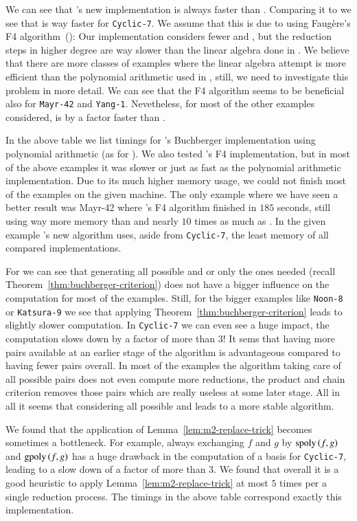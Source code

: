We can see that \singular's new implementation is always faster than \macaulay.
Comparing it to \magma we see that \magma is way faster for \texttt{Cyclic-7}.
We assume that this is due to \magma using Faug\`ere's F4
algorithm~(\cite{fF41999}): Our implementation considers fewer \spts and \gpts, but
the reduction steps in higher degree are way slower than the linear algebra done
in \magma. We believe that there are more classes of examples where the linear
algebra attempt is more efficient than the polynomial arithmetic used in
\singular, still, we need to investigate this problem in more detail. We can see
that the F4 algorithm seems to be beneficial also for \texttt{Mayr-42} and \texttt{Yang-1}.
Nevetheless, for most of the other examples considered, \singular is by a
factor faster than \magma.

In the above table we list timings for \macaulay's Buchberger implementation
using polynomial arithmetic (as for \singular).
We also tested \macaulay's F4 implementation, but in most of the above examples
it was slower or just as fast as the polynomial arithmetic implementation. Due
to its much higher memory usage, we could not finish most of the examples on the
given machine. The only example where we have seen a better result was Mayr-42
where \macaulay's F4 algorithm finished in $185$ seconds, still using way more
memory than \magma and nearly $10$ times as much as \singular. In the given
example \singular's new algorithm uses, aside from \texttt{Cyclic-7}, the least memory
of all compared implementations.

For \singular we can see that generating all possible \spts and \gpts or only
the ones needed (recall Theorem~\ref{thm:buchberger-criterion}) does not have a
bigger influence on the computation for most of the examples.
Still, for the bigger examples like \texttt{Noon-8} or \texttt{Katsura-9} we see that applying
Theorem~\ref{thm:buchberger-criterion} leads to slightly slower computation. In
\texttt{Cyclic-7} we can even see a huge impact, the computation slows down by a factor
of more than $3$! It sems that having more pairs available at an earlier stage
of the algorithm is advantageous compared to having fewer pairs overall. In most
of the examples the algorithm taking care of all possible pairs does not even
compute more reductions, the product and chain criterion removes those
pairs which are really useless at some later stage. All in all it seems that
considering all possible \spts and \gpts leads to a more stable algorithm.

We found that the application of Lemma~\ref{lem:m2-replace-trick} becomes
sometimes a bottleneck. For example, always exchanging $f$ and $g$ by $\mathrm{spoly}\left({f},{g}\right)$ and $\mathrm{gpoly}\left({f},{g}\right)$ has a huge drawback in the computation of a basis for
\texttt{Cyclic-7}, leading to a slow down of a factor of more than $3$. We found
that overall it is a good heuristic to apply Lemma~\ref{lem:m2-replace-trick} at
most $5$ times per a single reduction process. The \singular timings in the
above table correspond exactly this implementation.
